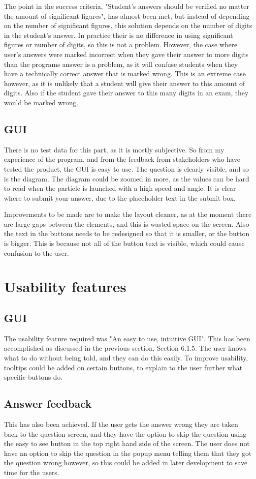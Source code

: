 The point in the success criteria, "Student's answers should be verified no matter the amount of significant figures", has almost been met, but instead of depending on the number of significant figures, this solution depends on the number of digits in the student's answer. In practice their is no difference in using significant figures or number of digits, so this is not a problem. However, the case where user's answers were marked incorrect when they gave their answer to more digits than the programs answer is a problem, as it will confuse students when they have a technically correct answer that is marked wrong. This is an extreme case however, as it is unlikely that a student will give their answer to this amount of digits. Also if the student gave their answer to this many digits in an exam, they would be marked wrong.
\subsection{GUI}
There is no test data for this part, as it is mostly subjective. So from my experience of the program, and from the feedback from stakeholders who have tested the product, the GUI is easy to use. The question is clearly visible, and so is the diagram. The diagram could be zoomed in more, as the values can be hard to read when the particle is launched with a high speed and angle. It is clear where to submit your answer, due to the placeholder text in the submit box. 

Improvements to be made are to make the layout cleaner, as at the moment there are large gaps between the elements, and this is wasted space on the screen. Also the text in the buttons needs to be redesigned so that it is smaller, or the button is bigger. This is because not all of the button text is visible, which could cause confusion to the user.
\section{Usability features}
\subsection{GUI}
The usability feature required was "An easy to use, intuitive GUI". This has been accomplished as discussed in the previous section, Section 6.1.5. The user knows what to do without being told, and they can do this easily. To improve usability, tooltips could be added on certain buttons, to explain to the user further what specific buttons do.
\subsection{Answer feedback}
This has also been achieved. If the user gets the answer wrong they are taken back to the question screen, and they have the option to skip the question using the easy to see button in the top right hand side of the screen. The user does not have an option to skip the question in the popup menu telling them that they got the question wrong however, so this could be added in later development to save time for the users.
